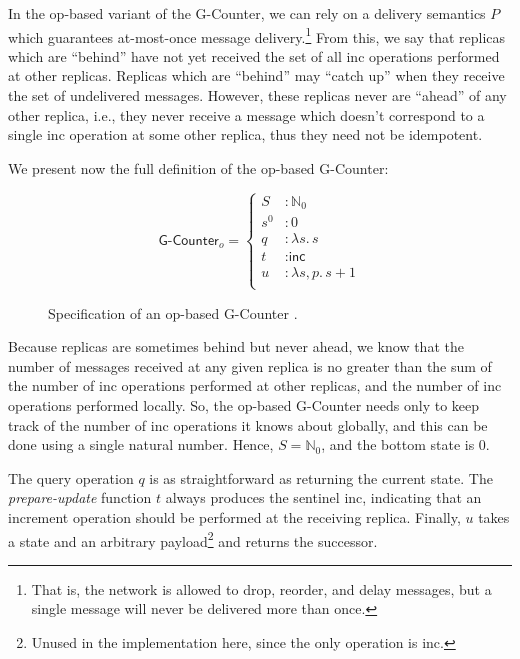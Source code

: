 In the op-based variant of the G-Counter, we can
rely on a delivery semantics $P$ which guarantees at-most-once message
delivery.\footnote{That is, the network is allowed to drop, reorder, and delay
messages, but a single message will never be delivered more than once.} From
this, we say that replicas which are ``behind'' have not yet received the set of
all \textsf{inc} operations performed at other replicas. Replicas which are
``behind'' may ``catch up'' when they receive the set of undelivered messages.
However, these replicas never are ``ahead'' of any other replica, i.e., they
never receive a message which doesn't correspond to a single \textsf{inc}
operation at some other replica, thus they need not be idempotent.

We present now the full definition of the op-based G-Counter:

\begin{figure}[H]
  \centering
  \[
    \textsf{G-Counter}_o = \left\{\begin{aligned}
      S &: \mathbb{N}_0 \\
      s^0 &: 0 \\
      q &: \lambda s.\, s \\
      t &: \textsf{inc} \\
      u &: \lambda s,p.\, s + 1 \\
    \end{aligned}\right.
  \]
  \caption{Specification of an op-based \textsf{G-Counter} \CRDT.}
\end{figure}

Because replicas are sometimes behind but never ahead, we know that the number
of messages received at any given replica is no greater than the sum of the
number of \textsf{inc} operations performed at other replicas, and the number of
\textsf{inc} operations performed locally. So, the op-based G-Counter needs only
to keep track of the number of \textsf{inc} operations it knows about globally,
and this can be done using a single natural number. Hence, $S = \mathbb{N}_0$,
and the bottom state is $0$.

The query operation $q$ is as straightforward as returning the current state.
The \emph{prepare-update} function $t$ always produces the sentinel
\textsf{inc}, indicating that an increment operation should be performed at the
receiving replica. Finally, $u$ takes a state and an arbitrary
payload\footnote{Unused in the implementation here, since the only operation is
\textsf{inc}.} and returns the successor.

